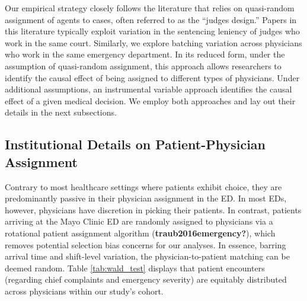 \documentclass{article}
\begin{document}
Our empirical strategy closely follows the literature that relies on
quasi-random assignment of agents to cases, often referred to as the
``judges design.'' Papers in this literature typically exploit variation
in the sentencing leniency of judges who work in the same court.
Similarly, we explore batching variation across physicians who work in
the same emergency department. In its reduced form, under the assumption
of quasi-random assignment, this approach allows researchers to identify
the causal effect of being assigned to different types of physicians.
Under additional assumptions, an instrumental variable approach
identifies the causal effect of a given medical decision. We employ both
approaches and lay out their details in the next subsections.

\hypertarget{institutional-details-on-patient-physician-assignment}{%
\subsection{Institutional Details on Patient-Physician
Assignment}\label{institutional-details-on-patient-physician-assignment}}

Contrary to most healthcare settings where patients exhibit choice, they
are predominantly passive in their physician assignment in the ED. In
most EDs, however, physicians have discretion in picking their patients.
In contrast, patients arriving at the Mayo Clinic ED are randomly
assigned to physicians via a rotational patient assignment algorithm
(\textbf{traub2016emergency?}), which removes potential selection bias
concerns for our analyses. In essence, barring arrival time and
shift-level variation, the physician-to-patient matching can be deemed
random. Table \ref{tab:wald_test} displays that patient encounters
(regarding chief complaints and emergency severity) are equitably
distributed across physicians within our study's cohort.
\end{document}
